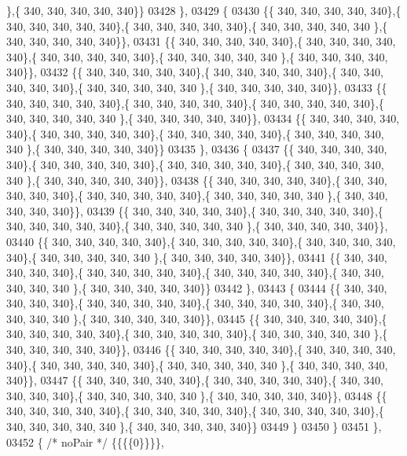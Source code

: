 \begin{DoxyCode}
      \},\{ 340, 340, 340, 340, 340\}\}
03428 \},
03429 \{
03430 \{\{ 340, 340, 340, 340, 340\},\{ 340, 340, 340, 340, 340\},\{ 340, 340, 340, 340, 340\},\{ 340, 340, 340, 340, 340
      \},\{ 340, 340, 340, 340, 340\}\},
03431 \{\{ 340, 340, 340, 340, 340\},\{ 340, 340, 340, 340, 340\},\{ 340, 340, 340, 340, 340\},\{ 340, 340, 340, 340, 340
      \},\{ 340, 340, 340, 340, 340\}\},
03432 \{\{ 340, 340, 340, 340, 340\},\{ 340, 340, 340, 340, 340\},\{ 340, 340, 340, 340, 340\},\{ 340, 340, 340, 340, 340
      \},\{ 340, 340, 340, 340, 340\}\},
03433 \{\{ 340, 340, 340, 340, 340\},\{ 340, 340, 340, 340, 340\},\{ 340, 340, 340, 340, 340\},\{ 340, 340, 340, 340, 340
      \},\{ 340, 340, 340, 340, 340\}\},
03434 \{\{ 340, 340, 340, 340, 340\},\{ 340, 340, 340, 340, 340\},\{ 340, 340, 340, 340, 340\},\{ 340, 340, 340, 340, 340
      \},\{ 340, 340, 340, 340, 340\}\}
03435 \},
03436 \{
03437 \{\{ 340, 340, 340, 340, 340\},\{ 340, 340, 340, 340, 340\},\{ 340, 340, 340, 340, 340\},\{ 340, 340, 340, 340, 340
      \},\{ 340, 340, 340, 340, 340\}\},
03438 \{\{ 340, 340, 340, 340, 340\},\{ 340, 340, 340, 340, 340\},\{ 340, 340, 340, 340, 340\},\{ 340, 340, 340, 340, 340
      \},\{ 340, 340, 340, 340, 340\}\},
03439 \{\{ 340, 340, 340, 340, 340\},\{ 340, 340, 340, 340, 340\},\{ 340, 340, 340, 340, 340\},\{ 340, 340, 340, 340, 340
      \},\{ 340, 340, 340, 340, 340\}\},
03440 \{\{ 340, 340, 340, 340, 340\},\{ 340, 340, 340, 340, 340\},\{ 340, 340, 340, 340, 340\},\{ 340, 340, 340, 340, 340
      \},\{ 340, 340, 340, 340, 340\}\},
03441 \{\{ 340, 340, 340, 340, 340\},\{ 340, 340, 340, 340, 340\},\{ 340, 340, 340, 340, 340\},\{ 340, 340, 340, 340, 340
      \},\{ 340, 340, 340, 340, 340\}\}
03442 \},
03443 \{
03444 \{\{ 340, 340, 340, 340, 340\},\{ 340, 340, 340, 340, 340\},\{ 340, 340, 340, 340, 340\},\{ 340, 340, 340, 340, 340
      \},\{ 340, 340, 340, 340, 340\}\},
03445 \{\{ 340, 340, 340, 340, 340\},\{ 340, 340, 340, 340, 340\},\{ 340, 340, 340, 340, 340\},\{ 340, 340, 340, 340, 340
      \},\{ 340, 340, 340, 340, 340\}\},
03446 \{\{ 340, 340, 340, 340, 340\},\{ 340, 340, 340, 340, 340\},\{ 340, 340, 340, 340, 340\},\{ 340, 340, 340, 340, 340
      \},\{ 340, 340, 340, 340, 340\}\},
03447 \{\{ 340, 340, 340, 340, 340\},\{ 340, 340, 340, 340, 340\},\{ 340, 340, 340, 340, 340\},\{ 340, 340, 340, 340, 340
      \},\{ 340, 340, 340, 340, 340\}\},
03448 \{\{ 340, 340, 340, 340, 340\},\{ 340, 340, 340, 340, 340\},\{ 340, 340, 340, 340, 340\},\{ 340, 340, 340, 340, 340
      \},\{ 340, 340, 340, 340, 340\}\}
03449 \}
03450 \}
03451 \},
03452 \{ \textcolor{comment}{/* noPair */} \{\{\{\{0\}\}\}\},

\end{DoxyCode}
